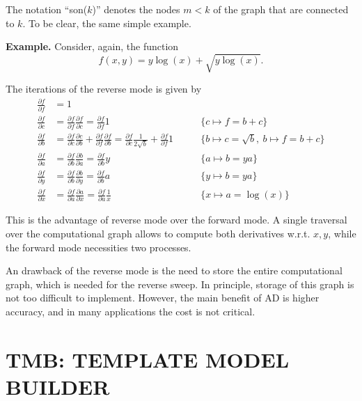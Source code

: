 The notation ``son(\(k\))'' denotes the nodes \(m < k\) of the graph
that are connected to \(k\). To be clear, the same simple example.

\noindent\textbf{Example.}\hspace{.5cm}
Consider, again, the function
\[
  f(x, y) = y\log(x) + \sqrt{y\log(x)}.
\]

The iterations of the reverse mode is given by
\begin{align*}
  \frac{\partial f}{\partial f} &= 1\\
  \frac{\partial f}{\partial c} &=
  \frac{\partial f}{\partial f} \frac{\partial f}{\partial c} =
  \frac{\partial f}{\partial f} 1\qquad &\{c \mapsto f = b + c\}\\
  \frac{\partial f}{\partial b} &=
  \frac{\partial f}{\partial c} \frac{\partial c}{\partial b} +
  \frac{\partial f}{\partial f} \frac{\partial f}{\partial b} =
  \frac{\partial f}{\partial c} \frac{1}{2\sqrt{b}} +
  \frac{\partial f}{\partial f} 1\qquad
  &\{b \mapsto c = \sqrt{b},~b \mapsto f = b + c\}\\
  \frac{\partial f}{\partial a} &=
  \frac{\partial f}{\partial b} \frac{\partial b}{\partial a} =
  \frac{\partial f}{\partial b} y\qquad &\{a \mapsto b = ya\}\\
  \frac{\partial f}{\partial y} &=
  \frac{\partial f}{\partial b} \frac{\partial b}{\partial y} =
  \frac{\partial f}{\partial b} a \qquad &\{y \mapsto b = ya\}\\
  \frac{\partial f}{\partial x} &=
  \frac{\partial f}{\partial a} \frac{\partial a}{\partial x} =
  \frac{\partial f}{\partial a} \frac{1}{x} \qquad
  &\{x \mapsto a = \log(x)\}
\end{align*}

This is the advantage of reverse mode over the forward mode. A single
traversal over the computational graph allows to compute both
derivatives w.r.t. \(x, y\), while the forward mode necessities two
processes.

An drawback of the reverse mode is the need to store the entire
computational graph, which is needed for the reverse sweep. In
principle, storage of this graph is not too difficult to implement.
However, the main benefit of AD is higher accuracy, and in many
applications the cost is not critical.


\section{TMB: TEMPLATE MODEL BUILDER}
\label{cap:tmb}

